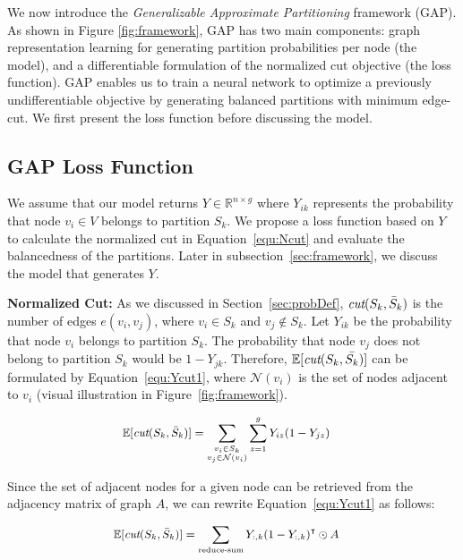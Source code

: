\documentclass[10pt,twocolumn]{article}
\begin{document}
We now introduce the \emph{Generalizable Approximate Partitioning} framework (GAP). As shown in Figure \ref{fig:framework}, GAP has two main components: graph representation learning for generating partition probabilities per node (the model), and a differentiable formulation of the normalized cut objective (the loss function). GAP enables us to train a neural network to optimize a previously undifferentiable objective by generating balanced partitions with minimum edge-cut. We first present the loss function before discussing the model.


\subsection{GAP Loss Function}
\label{sec:loss}
We assume that our model returns $Y \in \mathbb{R}^{n \times g}$ where $Y_{ik}$ represents the probability that node $v_i \in V$ belongs to partition $S_k$. We propose a loss function based on $Y$ to calculate the normalized cut in Equation~\ref{equ:Ncut} and evaluate the balancedness of the partitions. Later in subsection~\ref{sec:framework}, we discuss the model that generates $Y$. 

\noindent\textbf{Normalized Cut:} 
As we discussed in Section~\ref{sec:probDef}, $\emph{cut}(S_k, \bar{S}_k)$ is the number of edges $e(v_i, v_j)$, where $v_i \in S_k$ and $v_j \notin S_k$. Let $Y_{ik}$ be the probability that node $v_i$ belongs to partition $S_k$. The probability that node $v_j$ does not belong to partition $S_k$ would be $1 - Y_{jk}$. Therefore, $\mathbb{E}[\emph{cut}(S_k, \bar{S_k})]$ can be formulated by Equation~\ref{equ:Ycut1}, where $\mathcal{N}(v_i)$ is the set of nodes adjacent to $v_i$ (visual illustration in Figure~\ref{fig:framework}).

\begin{equation}
\label{equ:Ycut1}
\small
\begin{aligned}
\mathbb{E}[\emph{cut}(S_k, \bar{S}_k)] &= \sum_{\substack{v_i \in S_k \\ v_j \in \mathcal{N}(v_i)}} \sum_{z=1}^{g}  Y_{iz} (1-Y_{jz})
\end{aligned}
\end{equation}

Since the set of adjacent nodes for a given node can be retrieved from the adjacency matrix of graph $A$, we can rewrite Equation~\ref{equ:Ycut1} as follows:

\begin{equation}
\label{equ:Ycut}
\small
\begin{aligned}
\mathbb{E}[\emph{cut}(S_k, \bar{S}_k)] &= \sum_\text{reduce-sum} Y_{:,k} (1-Y_{:,k})^\intercal \odot A
\end{aligned}
\end{equation}
\end{document}
